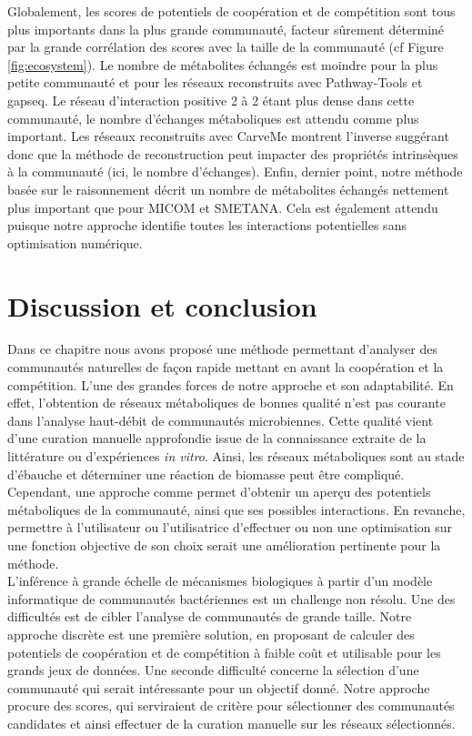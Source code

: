\documentclass[../main.tex]{subfiles}
\begin{document}
Globalement, les scores de potentiels de coopération et de compétition sont tous plus importants dans la plus grande communauté, facteur sûrement déterminé par la grande corrélation des scores avec la taille de la communauté (cf Figure \ref{fig:ecosystem}). Le nombre de métabolites échangés est moindre pour la plus petite communauté et pour les réseaux reconstruits avec Pathway-Tools et gapseq. Le réseau d'interaction positive 2 à 2 étant plus dense dans cette communauté, le nombre d'échanges métaboliques est attendu comme plus important. Les réseaux reconstruits avec CarveMe montrent l'inverse suggérant donc que la méthode de reconstruction peut impacter des propriétés intrinsèques à la communauté (ici, le nombre d'échanges).
Enfin, dernier point, notre méthode basée sur le raisonnement décrit un nombre de métabolites échangés nettement plus important que pour MICOM et SMETANA. Cela est également attendu puisque notre approche identifie toutes les interactions potentielles sans optimisation numérique. 

\section{Discussion et conclusion}
Dans ce chapitre nous avons proposé une méthode permettant d'analyser des communautés naturelles de façon rapide mettant en avant la coopération et la compétition. L'une des grandes forces de notre approche et son adaptabilité. En effet, l'obtention de réseaux métaboliques de bonnes qualité n'est pas courante dans l'analyse haut-débit de communautés microbiennes. Cette qualité vient d'une curation manuelle approfondie issue de la connaissance extraite de la littérature ou d'expériences \textit{in vitro}.  Ainsi, les réseaux métaboliques sont au stade d'ébauche et déterminer une réaction de biomasse peut être compliqué. Cependant, une approche comme \ccmc permet d'obtenir un aperçu des potentiels métaboliques de la communauté, ainsi que ses possibles interactions.  En revanche, permettre à l'utilisateur ou l'utilisatrice d'effectuer ou non une optimisation sur une fonction objective de son choix serait une amélioration pertinente pour la méthode. \\

L'inférence à grande échelle de mécanismes biologiques à partir d'un modèle informatique de communautés bactériennes est un challenge non résolu. Une des difficultés est de cibler l'analyse de communautés de grande taille. Notre approche discrète est une première solution, en proposant de calculer des potentiels de coopération et de compétition à faible coût et utilisable pour les grands jeux de données. Une seconde difficulté concerne la sélection d'une communauté qui serait intéressante pour un objectif donné. Notre approche procure des scores, qui serviraient de critère pour sélectionner des communautés candidates et ainsi effectuer de la curation manuelle sur les réseaux sélectionnés. \\
\end{document}
